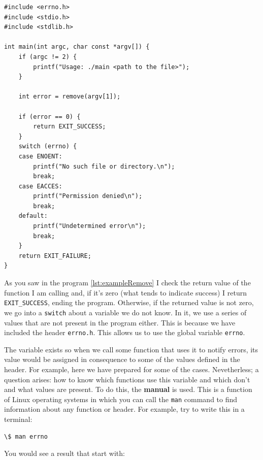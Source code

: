 \documentclass[a4paper]{article}
\begin{document}
\noindent
\begin{minipage}[H]{\linewidth}
\mbox{}
\begin{lstlisting}[style=C,
caption={Ejemplo de programa que usa la variable \texttt{errno}},
label={lst:exampleRemove2}]
#include <errno.h>
#include <stdio.h>
#include <stdlib.h>

int main(int argc, char const *argv[]) {
    if (argc != 2) {
        printf("Usage: ./main <path to the file>");
    }

    int error = remove(argv[1]);

    if (error == 0) {
        return EXIT_SUCCESS;
    }
    switch (errno) {
    case ENOENT:
        printf("No such file or directory.\n");
        break;
    case EACCES:
        printf("Permission denied\n");
        break;
    default:
        printf("Undetermined error\n");
        break;
    }
    return EXIT_FAILURE;
}
\end{lstlisting}
\end{minipage}

As you saw in the program \ref{lst:exampleRemove} I check the return value of
the function I am calling and, if it's zero (what tends to indicate success)
I return \verb!EXIT_SUCCESS!, ending the program. Otherwise, if the returned
value is not zero, we go into a \verb"switch" about a variable we do not know.
In it, we use a series of values that are not present in the program either.
This is because we have included the header \verb!errno.h!. This allows us to
use the global variable \verb!errno!.

The variable exists so when we call some function that uses it to notify errors,
its value would be assigned in consequence to some of the values defined in the
header. For example, here we have prepared for some of the cases. Nevetherless;
a question arises: how to know which functions use this variable and which don't
and what values are present. To do this, the \textbf{manual} is used. This is a
function of Linux operating systems in which you can call the \verb!man! command
to find information about any function or header. For example, try to write this
in a terminal:

\noindent
\begin{minipage}[H]{\linewidth}
\mbox{}
\begin{lstlisting}[style=terminalStyle]
\$ man errno
\end{lstlisting}
\end{minipage}

You would see a result that start with:
\end{document}
